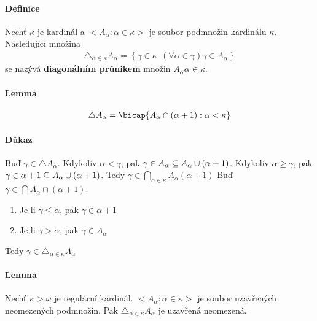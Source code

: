 \documentclass[a4paper,12pt,titlepage]{article}
\begin{document}
\begin{enumerate}
\paragraph{Definice}
Nechť $\kappa$ je kardinál a $<A_\alpha : \alpha \in \kappa>$ je soubor podmnožin
kardinálu $\kappa$. Následující množina 
\begin{align}
	\triangle_{\alpha \in \kappa} A_\alpha = \left\{ \gamma \in \kappa: (\forall
	\alpha \in \gamma) \gamma \in A_\alpha \right\}
\end{align}
se nazývá \textbf{diagonálním průnikem} množin $A_\alpha \alpha \in \kappa$.
\paragraph{Lemma}
\begin{align}
	\triangle A_\alpha = \bicap \{ A_\alpha \cap (\alpha+1): \alpha < \kappa \}
\end{align}
\paragraph{Důkaz}
Buď $\gamma \in \triangle A_\alpha$. Kdykoliv $\alpha < \gamma$, pak $\gamma \in
A_\alpha \subseteq A_\alpha \cup (\alpha + 1)$. Kdykoliv $\alpha \ge \gamma$, pak
$\gamma \in \alpha+1 \subseteq A_\alpha \cup (\alpha+1)$. Tedy $\gamma \in
\bigcap_{\alpha \in \kappa} A_\alpha (\alpha+1)$
Buď $\gamma \in \bigcap A_\alpha \cap (\alpha+1)$.
\begin{enumerate}
	\item Je-li $\gamma \le \alpha$, pak $\gamma \in \alpha + 1$
	\item Je-li $\gamma > \alpha$, pak $\gamma \in A_\alpha$ 
\end{enumerate}
Tedy $\gamma \in \triangle_{\alpha \in \kappa} A_\alpha$
\paragraph{Lemma}
Nechť $\kappa > \omega$ je regulární kardinál. $<A_\alpha: \alpha \in\kappa>$ je
soubor uzavřených neomezených podmnožin. Pak $\triangle_{\alpha\in\kappa} A_\alpha$ je uzavřená
neomezená.

\end{enumerate}
\end{document}
